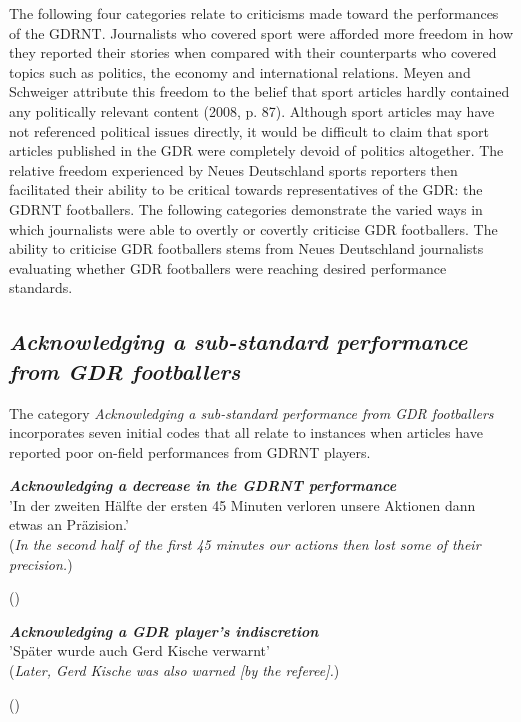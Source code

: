 The following four categories relate to criticisms made toward the performances of the GDRNT. Journalists who covered sport were afforded more freedom in how they reported their stories when compared with their counterparts who covered topics such as politics, the economy and international relations. Meyen and Schweiger attribute this freedom to the belief that sport articles hardly contained any politically relevant content (2008, p. 87). Although sport articles may have not referenced political issues directly, it would be difficult to claim that sport articles published in the GDR were completely devoid of politics altogether. The relative freedom experienced by Neues Deutschland sports reporters then facilitated their ability to be critical towards representatives of the GDR: the GDRNT footballers. The following categories demonstrate the varied ways in which journalists were able to overtly or covertly criticise GDR footballers. The ability to criticise GDR footballers stems from Neues Deutschland journalists evaluating whether GDR footballers were reaching desired performance standards.

\subsection*{\textit{Acknowledging a sub-standard performance from GDR footballers}}

The category \textit{Acknowledging a sub-standard performance from GDR footballers} incorporates seven initial codes that all relate to instances when articles have reported poor on-field performances from GDRNT players.

\begin{displayquote}
\begin{small}
\textbf{\textit{Acknowledging a decrease in the GDRNT performance}}\\
'In der zweiten Hälfte der ersten 45 Minuten verloren unsere Aktionen dann etwas an Präzision.'\\
(\textit{In the second half of the first 45 minutes our actions then lost some of their precision.})\
\begin{flushright}\footnotesize (\cite{nd19740619})\end{flushright}
\end{small}
\end{displayquote}

\begin{displayquote}
\begin{small}
\textbf{\textit{Acknowledging a GDR player’s indiscretion}}\\
'Später wurde auch Gerd Kische verwarnt'\\
(\textit{Later, Gerd Kische was also warned [by the referee].})\
\begin{flushright}\footnotesize (\cite{nd19740619})\end{flushright}
\end{small}
\end{displayquote}


